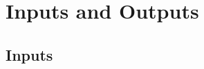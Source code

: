 \documentclass{../tex/report}
\begin{document}
\section{Inputs and Outputs}

\subsection{Inputs}












\end{document}

